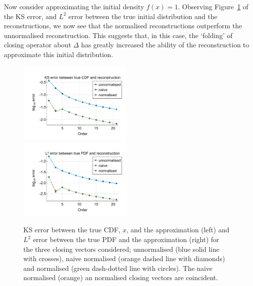 \begin{example}Now consider approximating the initial density \(f(x)=1\). Observing Figure~\ref{fig: fun 4 ks error qbdrap closing vecs} of the KS error, and \(L^2\) error between the true initial distribution and the reconstructions, we now see that the normalised reconstructions outperform the unnormalised reconstruction. This suggests that, in this case, the `folding' of closing operator about \(\Delta\) has greatly increased the ability of the reconstruction to approximate this initial distribution. 
\begin{figure}
	\centering
	\includegraphics[width=0.5\textwidth,trim={1.25cm 0.8cm 0.25cm 1.25cm},clip]{chapter6/figs/qbdrap_closing_vec/fun4/ks_error_formatted.pdf}%
	\includegraphics[width=0.5\textwidth,trim={1.25cm 0.8cm 0.25cm 1.25cm},clip]{chapter6/figs/qbdrap_closing_vec/fun4/l2_pdf_error_formatted.pdf}
	\caption{KS error between the true CDF, \(x\), and the approximation (left) and \(L^2\) error between the true PDF and the approximation (right) for the three closing vectors considered; unnormalised (blue solid line with crosses), naive normalised (orange dashed line with diamonds) and normalised (green dash-dotted line with circles). The naive normalised (orange) an normalised closing vectors are coincident.}
	\label{fig: fun 4 ks error qbdrap closing vecs}
\end{figure}


\end{example}
